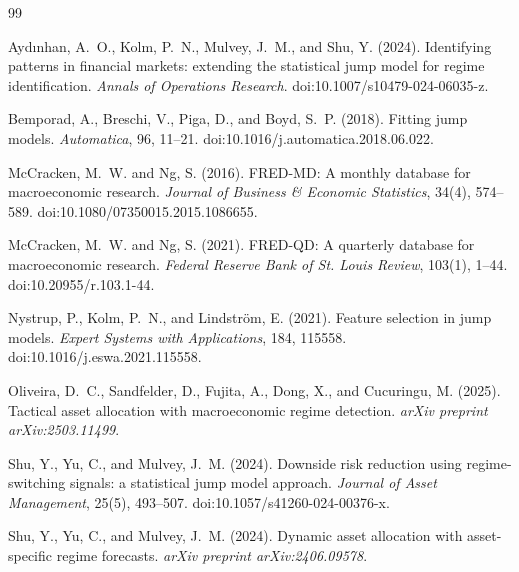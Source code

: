 \documentclass[10pt]{article}
\begin{document}
\begin{thebibliography}{99}

Ayd{\i}nhan, A.~O., Kolm, P.~N., Mulvey, J.~M., and Shu, Y. (2024).
Identifying patterns in financial markets: extending the statistical jump model for regime identification.
\emph{Annals of Operations Research}.
doi:10.1007/s10479-024-06035-z.

Bemporad, A., Breschi, V., Piga, D., and Boyd, S.~P. (2018).
Fitting jump models.
\emph{Automatica}, 96, 11--21.
doi:10.1016/j.automatica.2018.06.022.

McCracken, M.~W. and Ng, S. (2016).
FRED-MD: A monthly database for macroeconomic research.
\emph{Journal of Business \& Economic Statistics}, 34(4), 574--589.
doi:10.1080/07350015.2015.1086655.

McCracken, M.~W. and Ng, S. (2021).
FRED-QD: A quarterly database for macroeconomic research.
\emph{Federal Reserve Bank of St. Louis Review}, 103(1), 1--44.
doi:10.20955/r.103.1-44.

Nystrup, P., Kolm, P.~N., and Lindstr{\"o}m, E. (2021).
Feature selection in jump models.
\emph{Expert Systems with Applications}, 184, 115558.
doi:10.1016/j.eswa.2021.115558.

Oliveira, D.~C., Sandfelder, D., Fujita, A., Dong, X., and Cucuringu, M. (2025).
Tactical asset allocation with macroeconomic regime detection.
\emph{arXiv preprint arXiv:2503.11499}.

Shu, Y., Yu, C., and Mulvey, J.~M. (2024).
Downside risk reduction using regime-switching signals: a statistical jump model approach.
\emph{Journal of Asset Management}, 25(5), 493--507.
doi:10.1057/s41260-024-00376-x.

Shu, Y., Yu, C., and Mulvey, J.~M. (2024).
Dynamic asset allocation with asset-specific regime forecasts.
\emph{arXiv preprint arXiv:2406.09578}.

\end{thebibliography}
\end{document}
